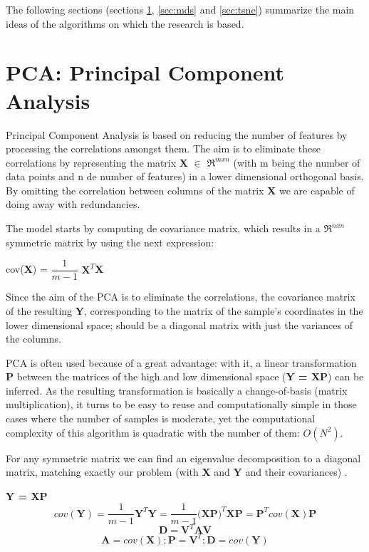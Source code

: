 \documentclass[a4paper,11pt,spanish]{report}
\begin{document}
The following sections (sections \ref{sec:pca}, \ref{sec:mds} and \ref{sec:tsne}) summarize the main ideas of the algorithms on which the research is based. 

\section{PCA: Principal Component Analysis}
\label{sec:pca}

Principal Component Analysis \citep{pca} is based on reducing the number of features by processing the correlations amongst them. The aim is to eliminate these correlations by representing the matrix \textbf{X} $\in$ $\Re^{mxn}$ (with m being the number of data points and n de number of features) in a lower dimensional orthogonal basis. By omitting the correlation between columns of the matrix \textbf{X} we are capable of doing away with redundancies.

The model starts by computing de covariance matrix, which results in a $\Re^{nxn}$ symmetric matrix by using the next expression:
\begin{center}
cov(\textbf{X}) = $\dfrac{1}{m-1}$ $\textbf{X}^{T}$\textbf{X}
\end{center}
Since the aim of the PCA is to eliminate the correlations, the covariance matrix of the resulting \textbf{Y}, corresponding to the matrix of the sample's coordinates in the lower dimensional space; should be a diagonal matrix with just the variances of the columns.

PCA is often used because of a great advantage: with it, a linear transformation \textbf{P} between the matrices of the high and low dimensional space (\textbf{Y = XP}) can be inferred. As the resulting transformation is basically a change-of-basis (matrix multiplication), it turns to be easy to reuse and computationally simple in those cases where the number of samples is moderate, yet the computational complexity of this algorithm is quadratic with the number of them: $O(N^{2})$.

For any symmetric matrix we can find an eigenvalue decomposition to a diagonal matrix, matching exactly our problem (with \textbf{X} and \textbf{Y} and their covariances) \citep{pca}.

\begin{center}
\textbf{Y = XP}
$$ cov(\textbf{Y}) = \frac{1}{m-1} \textbf{Y}^{T} \textbf{Y} = \frac{1}{m-1} \textbf{(XP)}^{T} \textbf{XP} = \textbf{P}^{T} cov(\textbf{X})\textbf{P} $$
$$\textbf{D} = \textbf{V}^{T} \textbf{AV}$$
$$ \textbf{A} = cov(\textbf{X}); \textbf{P} = \textbf{V}^{T}; \textbf{D} = cov(\textbf{Y})$$
\end{center}
\end{document}
